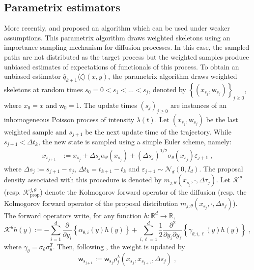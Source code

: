 \documentclass[12pt]{article}
\newcommand{\parvec}{\theta}
\newcommand{\hdhat}[1]{\widehat{q}_{#1}}
\newcommand{\eqdef}{\ensuremath{:=}}
\newcommand{\eqsp}{\;}
\begin{document}
\subsection{Parametrix estimators}

More recently, \cite{andersson2017unbiased} and \cite{fearnhead2017continuous} proposed an algorithm which can be used under weaker assumptions. 
This parametrix algorithm draws weighted skeletons using an importance sampling mechanism for diffusion processes. 
In this case, the sampled paths are not distributed as the target process but the weighted samples produce unbiased estimates of expectations of functionals of this process. To obtain an unbiased estimator $\hdhat{k+1}\langle \zeta\rangle(x,y)$, the parametrix algorithm draws weighted skeletons at random times $s_0 = 0 < s_1<\dots<s_j $, denoted by $\left\{(x_{s_j},\mathsf{w}_{s_j})\right\}_{j\geqslant 0}$, where $x_0 = x$ and $\mathsf{w}_0=1$. 
The update times $(s_j)_{j\geqslant 0}$ are instances of an inhomogeneous Poisson process of intensity $\lambda(t)$. 
Let $(x_{s_j},\mathsf{w}_{s_j})$ be the last weighted sample and $s_{j+1}$ be the next update time of the trajectory.  While $s_{j+1}<\Delta t_{k}$, the new state is sampled using a simple Euler scheme, namely:
\begin{align*}
x_{s_{j+1}} &\eqdef x_{s_j} + \Delta s_j\alpha_{\parvec}(x_{s_j}) + (\Delta s_j)^{1/2}\sigma_{\parvec}(x_{s_j})\varepsilon_{j+1}\eqsp,
\end{align*}
where $\Delta s_j \eqdef s_{j+1}-s_j$, $\Delta t_{k} = t_{k+1} - t_{k}$ and $\varepsilon_{j+1}\sim\mathcal{N}_d(0,I_d)$. 
The proposal density associated with this procedure is denoted by $m_{j;\parvec}\left(x_{s_j},\cdot,\Delta\tau_j\right)$. 
Let $\mathcal{K}^{\parvec}$ (resp. $\mathcal{K}^{j,\parvec}_{\mathrm{prop}}$) denote the Kolmogorov forward operator of the diffusion  (resp. the Kolmogorov forward operator of the proposal distribution $m_{j;\parvec}\left(x_{s_j},\cdot,\Delta s_j
\right)$). 
The forward operators write, for any function $h:\mathbb{R}^d\rightarrow\mathbb{R}$,
$$
\mathcal{K}^{\theta}h\left(y\right) \eqdef -\sum_{i=1}^d\frac{\partial}{\partial y_i}\left\{\alpha_{\parvec,i}(y)h\left(y\right)\right\} + \sum_{i,\ell=1}^d\frac{1}{2}\frac{\partial^2}{\partial y_i\partial y_\ell}\left\{\gamma_{\parvec,i,\ell}(y)h\left(y\right)\right\}\eqsp,
$$
where $\gamma_\parvec = \sigma_\parvec \sigma_\parvec^T$.
Then, following \cite{fearnhead2017continuous}, the weight is updated by
\[
\mathsf{w}_{s_{j+1}}\eqdef\mathsf{w}_{s_j}\rho^{\lambda}_j\left(x_{s_j},x_{s_{j+1}},\Delta s_j\right)\eqsp,
\]
\end{document}
